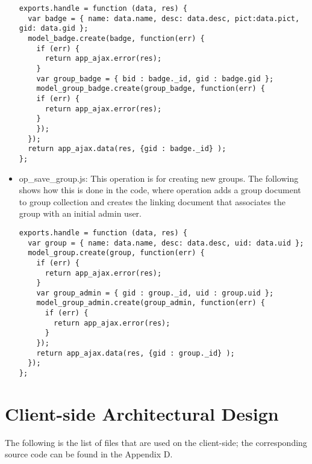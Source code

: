 \begin{itemize}
\begin{lstlisting}
exports.handle = function (data, res) {
  var badge = { name: data.name, desc: data.desc, pict:data.pict, gid: data.gid };
  model_badge.create(badge, function(err) {
    if (err) {
      return app_ajax.error(res);
    }
    var group_badge = { bid : badge._id, gid : badge.gid };
    model_group_badge.create(group_badge, function(err) {
    if (err) {
      return app_ajax.error(res);
    }
    });
  });
  return app_ajax.data(res, {gid : badge._id} );  
};
\end{lstlisting}

\item op{\_}save{\_}group.js: This operation is for creating new groups. The following shows how this is done in the code, where operation adds a group document to group collection and creates the linking document that associates the group with an initial admin user. 

\begin{lstlisting}
exports.handle = function (data, res) {
  var group = { name: data.name, desc: data.desc, uid: data.uid };
  model_group.create(group, function(err) {
    if (err) {
      return app_ajax.error(res);
    }
    var group_admin = { gid : group._id, uid : group.uid };
    model_group_admin.create(group_admin, function(err) {
      if (err) {
        return app_ajax.error(res);
      }      
    });
    return app_ajax.data(res, {gid : group._id} );
  });
};
\end{lstlisting}

\end{itemize}

\section{Client-side Architectural Design}
The following is the list of files that are used on the client-side; the corresponding source code can be found in the Appendix D.

